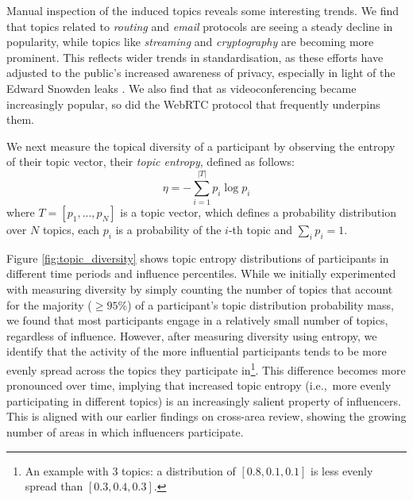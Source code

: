\documentclass[twocolumn,10pt]{article}
\begin{document}
Manual inspection of the induced topics reveals some interesting trends. We
find that topics related to \emph{routing} and \emph{email} protocols are
seeing a steady decline in popularity, while topics like \emph{streaming}
and \emph{cryptography} are becoming more prominent. This reflects wider
trends in standardisation, as these efforts have adjusted to the public's
increased awareness of privacy, especially in light of the Edward Snowden
leaks \cite{RFC7258,RFC9446}. We also find that as videoconferencing became
increasingly popular, so did the WebRTC protocol that frequently underpins
them.

We next measure the topical diversity of a participant by observing the
entropy of their topic vector, their \emph{topic entropy}, defined as
follows:
\begin{equation}
  \eta = - \sum_{i=1}^{|T|} p_i \log p_i \nonumber
\end{equation}
where $T = [p_1, ..., p_N]$ is a topic vector, which defines a probability
distribution over $N$ topics, each $p_i$ is a probability of the $i$-th
topic and $\sum_i p_i = 1$.

Figure \ref{fig:topic_diversity} shows topic entropy distributions of
participants in different time periods and influence percentiles. While we
initially experimented with measuring diversity by simply counting the
number of topics that account for the majority ($ \geq 95\% $) of a
participant's topic distribution probability mass, we found that most
participants engage in a relatively small number of topics, regardless of
influence. However, after measuring diversity using entropy, we identify
that the activity of the more influential participants tends to be more
evenly spread across the topics they participate in\footnote{An example
with 3 topics: a distribution of $[0.8, 0.1, 0.1]$ is less evenly spread
than $[0.3, 0.4, 0.3]$.}. This difference becomes more pronounced over
time, implying that increased topic entropy (i.e.,~more evenly participating
in different topics) is an increasingly salient property of influencers.
This is aligned with our earlier findings on cross-area review, showing the
growing number of areas in which influencers participate.
\end{document}
